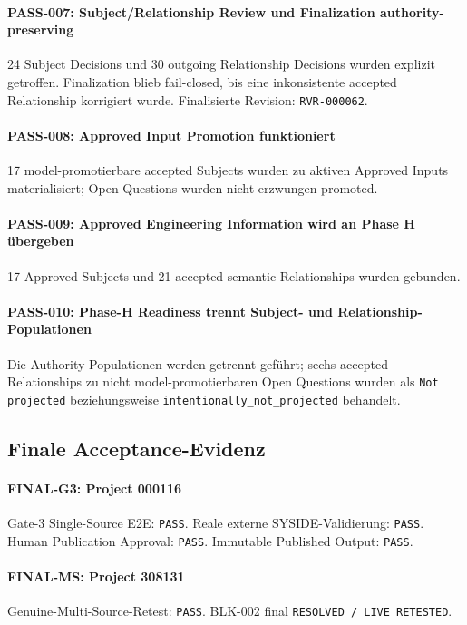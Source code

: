 \paragraph{PASS-007: Subject/Relationship Review und Finalization authority-preserving}
24 Subject Decisions und 30 outgoing Relationship Decisions wurden explizit
getroffen. Finalization blieb fail-closed, bis eine inkonsistente accepted
Relationship korrigiert wurde. Finalisierte Revision: \texttt{RVR-000062}.

\paragraph{PASS-008: Approved Input Promotion funktioniert}
17 model-promotierbare accepted Subjects wurden zu aktiven Approved Inputs
materialisiert; Open Questions wurden nicht erzwungen promoted.

\paragraph{PASS-009: Approved Engineering Information wird an Phase H übergeben}
17 Approved Subjects und 21 accepted semantic Relationships wurden gebunden.

\paragraph{PASS-010: Phase-H Readiness trennt Subject- und Relationship-Populationen}
Die Authority-Populationen werden getrennt geführt; sechs accepted Relationships
zu nicht model-promotierbaren Open Questions wurden als \texttt{Not projected}
beziehungsweise \texttt{intentionally\_not\_projected} behandelt.

\subsection{Finale Acceptance-Evidenz}

\paragraph{FINAL-G3: Project 000116}
Gate-3 Single-Source E2E: \texttt{PASS}. Reale externe SYSIDE-Validierung:
\texttt{PASS}. Human Publication Approval: \texttt{PASS}. Immutable Published
Output: \texttt{PASS}.

\paragraph{FINAL-MS: Project 308131}
Genuine-Multi-Source-Retest: \texttt{PASS}. BLK-002 final
\texttt{RESOLVED / LIVE RETESTED}.

